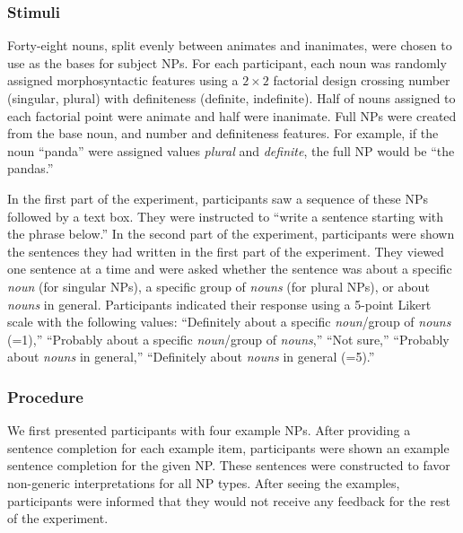 \documentclass[10pt,letterpaper]{article}
\begin{document}
\subsubsection{Stimuli}  

Forty-eight nouns, split evenly between animates and inanimates, were chosen to use as the bases for subject NPs. For each participant, each noun was randomly assigned morphosyntactic features using a \(2 \times 2\) factorial design crossing number (singular, plural) with definiteness (definite, indefinite). Half of nouns assigned to each factorial point were animate and half were inanimate. Full NPs were created from the base noun, and number and definiteness features. For example, if the noun ``panda'' were assigned values \textit{plural} and \textit{definite}, the full NP would be ``the pandas.''

In the first part of the experiment, participants saw a sequence of these NPs followed by a text box. They were instructed to ``write a sentence starting with the phrase below.'' In the second part of the experiment, participants were shown the sentences they had written in the first part of the experiment. They viewed one sentence at a time and were asked whether the sentence was about a specific \textit{noun} (for singular NPs), a specific group of \textit{nouns} (for plural NPs), or about \textit{nouns} in general. Participants indicated their response using a 5-point Likert scale with the following values: ``Definitely about a specific \textit{noun}/group of \textit{nouns} (=1),'' ``Probably about a specific \textit{noun}/group of \textit{nouns},'' ``Not sure,'' ``Probably about \textit{nouns} in general,'' ``Definitely about \textit{nouns} in general (=5).''

\subsubsection{Procedure} 

We first presented participants with four example NPs. After providing a sentence completion for each example item, participants were shown an example sentence completion for the given NP. These sentences were constructed to favor non-generic interpretations for all NP types. After seeing the examples, participants were informed that they would not receive any feedback for the rest of the experiment.
\end{document}
